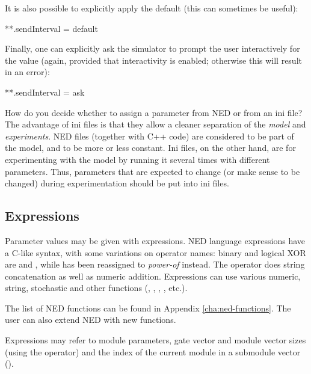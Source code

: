 It is also possible to explicitly apply the default (this can sometimes
be useful):

\begin{inifile}
**.sendInterval = default
\end{inifile}

Finally, one can explicitly ask the simulator to prompt the user interactively
for the value (again, provided that interactivity is enabled; otherwise
this will result in an error):

\begin{inifile}
**.sendInterval = ask
\end{inifile}

\begin{note}
    How do you decide whether to assign a parameter from NED or from an ini
    file? The advantage of ini files is that they allow a cleaner separation of the \textit{model}
    and \textit{experiments}. NED files (together with C++ code) are considered
    to be part of the model, and to be more or less constant. Ini files, on
    the other hand, are for experimenting with the model by running it
    several times with different parameters. Thus, parameters that are expected
    to change (or make sense to be changed) during experimentation should be
    put into ini files.
\end{note}


\subsection{Expressions}
\label{sec:ned-lang:expressions}

Parameter values may be given with expressions. NED language expressions
have a C-like syntax, with some variations on operator names: binary and
logical XOR are \ttt{\#} and \ttt{\#\#}, while \ttt{\^} has been reassigned
to \textit{power-of} instead. The \ttt{+} operator does string
concatenation as well as numeric addition. Expressions can use various
numeric, string, stochastic and other functions (, ,
, , etc.).

\begin{note}
    The list of NED functions can be found in Appendix \ref{cha:ned-functions}.
    The user can also extend NED with new functions.
\end{note}


Expressions may refer to module parameters, gate vector and module vector sizes
(using the  operator) and the index of the current module
in a submodule vector ().

